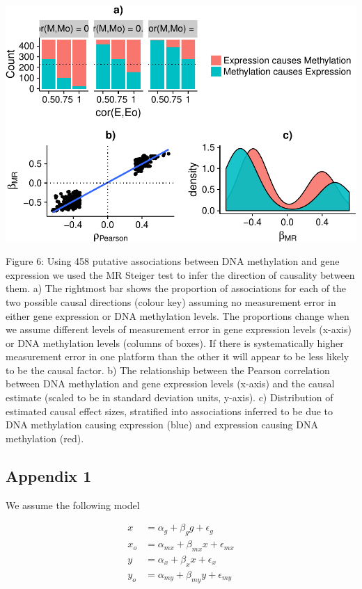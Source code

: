 \documentclass[]{article}
\begin{document}
\includegraphics{manuscript_files/figure-latex/shakhplot-1.pdf}

Figure 6: Using 458 putative associations between DNA methylation and
gene expression we used the MR Steiger test to infer the direction of
causality between them. a) The rightmost bar shows the proportion of
associations for each of the two possible causal directions (colour key)
assuming no measurement error in either gene expression or DNA
methylation levels. The proportions change when we assume different
levels of measurement error in gene expression levels (x-axis) or DNA
methylation levels (columns of boxes). If there is systematically higher
measurement error in one platform than the other it will appear to be
less likely to be the causal factor. b) The relationship between the
Pearson correlation between DNA methylation and gene expression levels
(x-axis) and the causal estimate (scaled to be in standard deviation
units, y-axis). c) Distribution of estimated causal effect sizes,
stratified into associations inferred to be due to DNA methylation
causing expression (blue) and expression causing DNA methylation (red).

\newpage

\subsection{Appendix 1}\label{appendix-1}

We assume the following model

\[
\begin{aligned}
x   & = \alpha_g + \beta_g g + \epsilon_g \\
x_o & = \alpha_{mx} + \beta_{mx} x + \epsilon_{mx} \\
y   & = \alpha_x + \beta_x x + \epsilon_x \\
y_o & = \alpha_{my} + \beta_{my} y + \epsilon_{my}
\end{aligned}
\]
\end{document}
